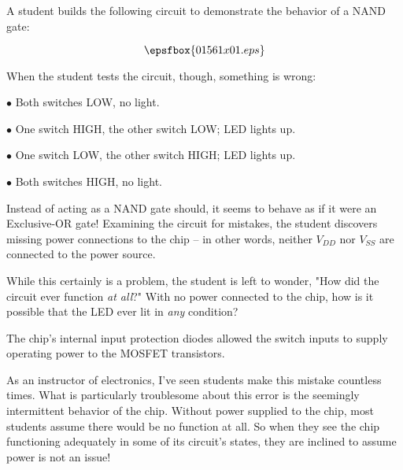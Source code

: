 

A student builds the following circuit to demonstrate the behavior of a NAND gate:

$$\epsfbox{01561x01.eps}$$

When the student tests the circuit, though, something is wrong:

\medskip
\item{$\bullet$} Both switches LOW, no light.
\item{$\bullet$} One switch HIGH, the other switch LOW; LED lights up.
\item{$\bullet$} One switch LOW, the other switch HIGH; LED lights up.
\item{$\bullet$} Both switches HIGH, no light.
\medskip

Instead of acting as a NAND gate should, it seems to behave as if it were an Exclusive-OR gate!  Examining the circuit for mistakes, the student discovers missing power connections to the chip -- in other words, neither $V_{DD}$ nor $V_{SS}$ are connected to the power source.

While this certainly is a problem, the student is left to wonder, "How did the circuit ever function {\it at all}?"  With no power connected to the chip, how is it possible that the LED ever lit in {\it any} condition?







The chip's internal input protection diodes allowed the switch inputs to supply operating power to the MOSFET transistors.







As an instructor of electronics, I've seen students make this mistake countless times.  What is particularly troublesome about this error is the seemingly intermittent behavior of the chip.  Without power supplied to the chip, most students assume there would be no function at all.  So when they see the chip functioning adequately in some of its circuit's states, they are inclined to assume power is not an issue!




